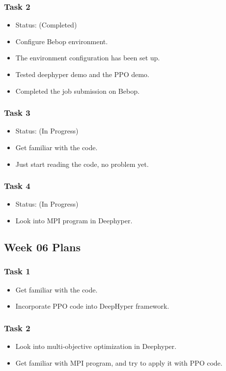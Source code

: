 \subsubsection{Task 2}
\begin{itemize}
\item Status: (Completed)
\item Configure Bebop environment.
\item The environment configuration has been set up.
\item Tested deephyper demo and the PPO demo.
\item Completed the job submission on Bebop.
\end{itemize}

\subsubsection{Task 3}
\begin{itemize}
\item Status: (In Progress)
\item Get familiar with the code.
\item Just start reading the code, no problem yet.
\end{itemize}

\subsubsection{Task 4}
\begin{itemize}
\item Status: (In Progress)
\item Look into MPI program in Deephyper.
\end{itemize}

\subsection{Week 06 Plans}

\subsubsection{Task 1}
\begin{itemize}
\item Get familiar with the code.
\item Incorporate PPO code into DeepHyper framework.
\end{itemize}

\subsubsection{Task 2}
\begin{itemize}
\item Look into multi-objective optimization in Deephyper.
\item Get familiar with MPI program, and try to apply it with PPO code.
\end{itemize}

